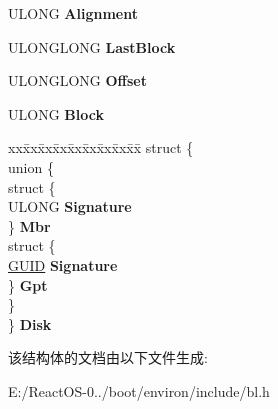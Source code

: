\begin{DoxyCompactItemize}
U\+L\+O\+NG {\bfseries Alignment}
\item 
\mbox{\label{struct___b_l___b_l_o_c_k___d_e_v_i_c_e___i_n_f_o_r_m_a_t_i_o_n_a52be445184d3ab34fc8509dfccc34a87}} 
U\+L\+O\+N\+G\+L\+O\+NG {\bfseries Last\+Block}
\item 
\mbox{\label{struct___b_l___b_l_o_c_k___d_e_v_i_c_e___i_n_f_o_r_m_a_t_i_o_n_a72e678b621ab10ad77c3feda8f952347}} 
U\+L\+O\+N\+G\+L\+O\+NG {\bfseries Offset}
\item 
\mbox{\label{struct___b_l___b_l_o_c_k___d_e_v_i_c_e___i_n_f_o_r_m_a_t_i_o_n_a478e32cb7143d424527b743a5de5ba1a}} 
U\+L\+O\+NG {\bfseries Block}
\item 
\mbox{\label{struct___b_l___b_l_o_c_k___d_e_v_i_c_e___i_n_f_o_r_m_a_t_i_o_n_ac66a2d96dacd440acd6f8b849f36dd2d}} 
\begin{tabbing}
xx\=xx\=xx\=xx\=xx\=xx\=xx\=xx\=xx\=\kill
struct \{\\
\mbox{\label{struct___b_l___b_l_o_c_k___d_e_v_i_c_e___i_n_f_o_r_m_a_t_i_o_n_1_1_0D130_a82aa1e074bbb1d75245ca1efe96aa99f}} 
\>union \{\\
\>\>struct \{\\
\>\>\>ULONG {\bfseries Signature}\\
\>\>\} {\bfseries Mbr}\\
\>\>struct \{\\
\>\>\>\hyperlink{interface_g_u_i_d}{GUID} {\bfseries Signature}\\
\>\>\} {\bfseries Gpt}\\
\>\} \\
\} {\bfseries Disk}\\

\end{tabbing}\end{DoxyCompactItemize}


该结构体的文档由以下文件生成\+:\begin{DoxyCompactItemize}
\item 
E\+:/\+React\+O\+S-\/0../boot/environ/include/bl.\+h\end{DoxyCompactItemize}

